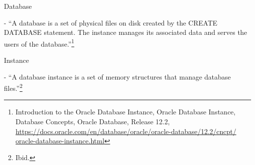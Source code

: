 \begin{itemize*}
\item{\begin{bf}Database\end{bf}} - ``A database is a set of physical
  files on disk created by the CREATE DATABASE statement. The instance
  manages its associated data and serves the users of the database.''\footnote{Introduction to the Oracle Database Instance, Oracle Database Instance, Database Concepts, Oracle Database,
    Release 12.2,
    \href{https://docs.oracle.com/en/database/oracle/oracle-database/12.2/cncpt/oracle-database-instance.html}{https://docs.oracle.com/en/database/oracle/oracle-database/12.2/cncpt/}\newline
  \href{http://www.google.com}{oracle-database-instance.html}}


\item{\begin{bf}Instance\end{bf}} - ``A database instance
  is a set of memory structures that manage database files.''\footnote{Ibid.}

\end{itemize*}




